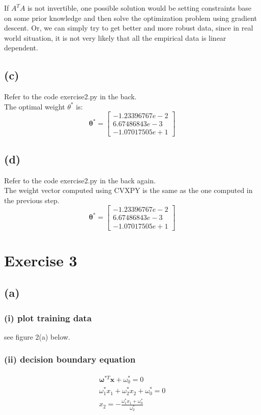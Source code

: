 \documentclass[11pt]{article}
\begin{document}
\noindent If $A^TA$ is not invertible, one possible solution would be setting constraints base on some prior knowledge and then solve the optimization problem using gradient descent.
Or, we can simply try to get better and more robust data, since in real world situation, it is not very likely that all the empirical data is linear dependent. 

\subsection*{(c)}
Refer to the code exercise2.py in the back.\\
The optimal weight $\theta^*$ is:\\
$$\pmb{\theta}^* = \begin{bmatrix}
-1.23396767e-2\\
6.67486843e-3\\
-1.07017505e+1
\end{bmatrix}$$

\subsection*{(d)}
Refer to the code exercise2.py in the back again.\\
The weight vector computed using CVXPY is the same as
the one computed in the previous step.\\
$$\pmb{\theta}^* = \begin{bmatrix}
-1.23396767e-2\\
6.67486843e-3\\
-1.07017505e+1
\end{bmatrix}$$
\pagebreak
\section*{Exercise 3}

\subsection*{(a)}
\subsubsection*{(i) plot training data}
see figure 2(a) below.


\subsubsection*{(ii) decision boundary equation}
\begin{equation}
\begin{split}
\pmb{\omega}^{*T}\pmb{x}+\omega_0^*=0\\
\omega_1^*x_1+\omega_2^*x_2+\omega_0^*=0\\
x_2=-\frac{\omega_1^*x_1+\omega_0^*}{\omega_2^*}
\end{split}
\end{equation}
\end{document}
